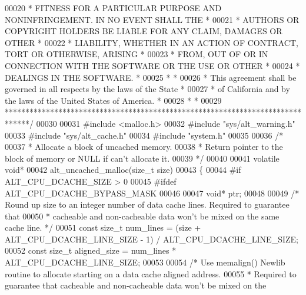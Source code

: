\begin{DoxyCode}
00020 \textcolor{comment}{* FITNESS FOR A PARTICULAR PURPOSE AND NONINFRINGEMENT. IN NO EVENT SHALL THE *}
00021 \textcolor{comment}{* AUTHORS OR COPYRIGHT HOLDERS BE LIABLE FOR ANY CLAIM, DAMAGES OR OTHER      *}
00022 \textcolor{comment}{* LIABILITY, WHETHER IN AN ACTION OF CONTRACT, TORT OR OTHERWISE, ARISING     *}
00023 \textcolor{comment}{* FROM, OUT OF OR IN CONNECTION WITH THE SOFTWARE OR THE USE OR OTHER         *}
00024 \textcolor{comment}{* DEALINGS IN THE SOFTWARE.                                                   *}
00025 \textcolor{comment}{*                                                                             *}
00026 \textcolor{comment}{* This agreement shall be governed in all respects by the laws of the State   *}
00027 \textcolor{comment}{* of California and by the laws of the United States of America.              *}
00028 \textcolor{comment}{*                                                                             *}
00029 \textcolor{comment}{******************************************************************************/}
00030 
00031 \textcolor{preprocessor}{#include <malloc.h>}
00032 \textcolor{preprocessor}{#include "sys/alt_warning.h"}
00033 \textcolor{preprocessor}{#include "sys/alt_cache.h"}
00034 \textcolor{preprocessor}{#include "system.h"}
00035 
00036 \textcolor{comment}{/*}
00037 \textcolor{comment}{ * Allocate a block of uncached memory.}
00038 \textcolor{comment}{ * Return pointer to the block of memory or NULL if can't allocate it.}
00039 \textcolor{comment}{ */}
00040 
00041 \textcolor{keyword}{volatile} \textcolor{keywordtype}{void}* 
00042 alt_uncached_malloc(\textcolor{keywordtype}{size\_t} size)
00043 \{
00044 \textcolor{preprocessor}{#if ALT\_CPU\_DCACHE\_SIZE > 0}
00045 \textcolor{preprocessor}{#ifdef ALT\_CPU\_DCACHE\_BYPASS\_MASK}
00046 
00047   \textcolor{keywordtype}{void}* ptr;
00048 
00049   \textcolor{comment}{/* Round up size to an integer number of data cache lines. Required to guarantee that}
00050 \textcolor{comment}{   * cacheable and non-cacheable data won't be mixed on the same cache line. */} 
00051   \textcolor{keyword}{const} \textcolor{keywordtype}{size\_t} num\_lines = (size + ALT_CPU_DCACHE_LINE_SIZE - 1) / 
      ALT_CPU_DCACHE_LINE_SIZE;
00052   \textcolor{keyword}{const} \textcolor{keywordtype}{size\_t} aligned\_size = num\_lines * ALT_CPU_DCACHE_LINE_SIZE;
00053 
00054   \textcolor{comment}{/* Use memalign() Newlib routine to allocate starting on a data cache aligned address.}
00055 \textcolor{comment}{   * Required to guarantee that cacheable and non-cacheable data won't be mixed on the}

\end{DoxyCode}
